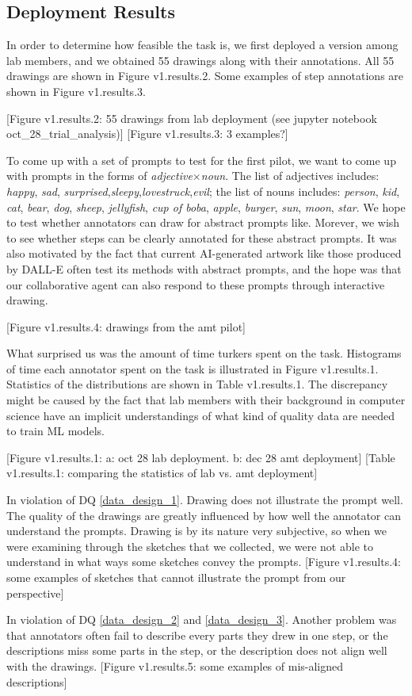 \subsection{Deployment Results}

In order to determine how feasible the task is, we first deployed a version among lab members, and we obtained 55 drawings along with their annotations. All 55 drawings are shown in Figure v1.results.2. Some examples of step annotations are shown in Figure v1.results.3.  

[Figure v1.results.2: 55 drawings from lab deployment (see jupyter notebook oct\_28\_trial\_analysis)]
[Figure v1.results.3: 3 examples?]

To come up with a set of prompts to test for the first pilot, we want to come up with prompts in the forms of \textit{adjective}$\times$\textit{noun}. The list of adjectives includes: \textit{happy}, \textit{sad}, \textit{surprised},\textit{sleepy},\textit{lovestruck},\textit{evil}; the list of nouns includes: \textit{person}, \textit{kid}, \textit{cat}, \textit{bear}, \textit{dog}, \textit{sheep}, \textit{jellyfish}, \textit{cup of boba}, \textit{apple}, \textit{burger}, \textit{sun}, \textit{moon}, \textit{star}. We hope to test whether annotators can draw for abstract prompts like. Morever, we wish to see whether steps can be clearly annotated for these abstract prompts. It was also motivated by the fact that current AI-generated artwork like those produced by DALL-E often test its methods with abstract prompts, and the hope was that our collaborative agent can also respond to these prompts through interactive drawing.   

[Figure v1.results.4: drawings from the amt pilot]

What surprised us was the amount of time turkers spent on the task. Histograms of time each annotator spent on the task is illustrated in Figure v1.results.1. Statistics of the distributions are shown in Table v1.results.1. The discrepancy might be caused by the fact that lab members with their background in computer science have an implicit understandings of what kind of quality data are needed to train ML models.   

[Figure v1.results.1: a: oct 28 lab deployment. b: dec 28 amt deployment]
[Table v1.results.1: comparing the statistics of lab vs. amt deployment]

In violation of DQ \ref{data_design_1}. Drawing does not illustrate the prompt well. The quality of the drawings are greatly influenced by how well the annotator can understand the prompts. Drawing is by its nature very subjective, so when we were examining through the sketches that we collected, we were not able to understand in what ways some sketches convey the prompts. 
[Figure v1.results.4: some examples of sketches that cannot illustrate the prompt from our perspective]

In violation of DQ \ref{data_design_2} and \ref{data_design_3}. Another problem was that annotators often fail to describe every parts they drew in one step, or the descriptions miss some parts in the step, or the description does not align well with the drawings.   
[Figure v1.results.5: some examples of mis-aligned descriptions]